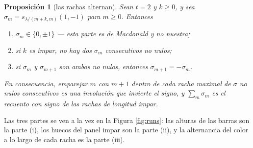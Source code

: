 \documentclass[11pt,reqno]{amsart}
\theoremstyle{plain}
\newtheorem{proposition}[theorem]{Proposición}
\theoremstyle{definition}
\begin{document}
\begin{proposition}[las rachas alternan]\label{rem:involution}
Sean $t=2$ y $k\ge0$, y sea $\sigma_m=s_{\lambda/(m+k,m)}(1,-1)$ para $m\ge0$. Entonces
\begin{enumerate}
\item[\rm(i)] $\sigma_m\in\{0,\pm1\}$ --- esta parte es de Macdonald y no nuestra;
\item[\rm(ii)] si $k$ es impar, no hay dos $\sigma_m$ consecutivos no nulos;
\item[\rm(iii)] si $\sigma_m$ y $\sigma_{m+1}$ son ambos no nulos, entonces
$\sigma_{m+1}=-\sigma_m$.
\end{enumerate}
En consecuencia, emparejar $m$ con $m+1$ dentro de cada racha maximal de $\sigma$ no nulos
consecutivos es una involución que invierte el signo, y $\sum_m\sigma_m$ es el recuento con signo de
las rachas de longitud impar.
\end{proposition}

Las tres partes se ven a la vez en la Figura \ref{fig:runs}: las alturas de las barras son la parte
{\rm(i)}, los huecos del panel impar son la parte {\rm(ii)}, y la alternancia del color a lo largo de
cada racha es la parte {\rm(iii)}.
\end{document}
